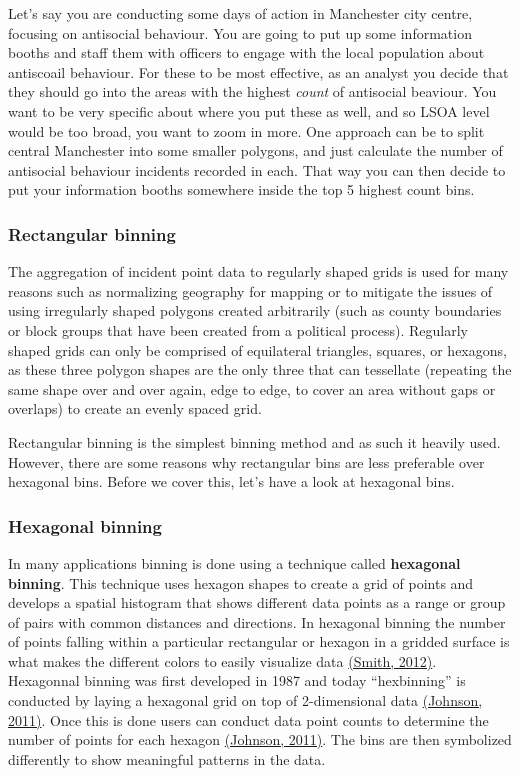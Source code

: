 \documentclass[]{book}
\begin{document}
Let's say you are conducting some days of action in Manchester city centre, focusing on antisocial behaviour. You are going to put up some information booths and staff them with officers to engage with the local population about antiscoail behaviour. For these to be most effective, as an analyst you decide that they should go into the areas with the highest \emph{count} of antisocial beaviour. You want to be very specific about where you put these as well, and so LSOA level would be too broad, you want to zoom in more. One approach can be to split central Manchester into some smaller polygons, and just calculate the number of antisocial behaviour incidents recorded in each. That way you can then decide to put your information booths somewhere inside the top 5 highest count bins.

\hypertarget{rectangular-binning}{%
\subsubsection{Rectangular binning}\label{rectangular-binning}}

The aggregation of incident point data to regularly shaped grids is used for many reasons such as normalizing geography for mapping or to mitigate the issues of using irregularly shaped polygons created arbitrarily (such as county boundaries or block groups that have been created from a political process). Regularly shaped grids can only be comprised of equilateral triangles, squares, or hexagons, as these three polygon shapes are the only three that can tessellate (repeating the same shape over and over again, edge to edge, to cover an area without gaps or overlaps) to create an evenly spaced grid.

Rectangular binning is the simplest binning method and as such it heavily used. However, there are some reasons why rectangular bins are less preferable over hexagonal bins. Before we cover this, let's have a look at hexagonal bins.

\hypertarget{hexagonal-binning}{%
\subsubsection{Hexagonal binning}\label{hexagonal-binning}}

In many applications binning is done using a technique called \textbf{hexagonal binning}. This technique uses hexagon shapes to create a grid of points and develops a spatial histogram that shows different data points as a range or group of pairs with common distances and directions. In hexagonal binning the number of points falling within a particular rectangular or hexagon in a gridded surface is what makes the different colors to easily visualize data \href{https://www.mapbox.com/blog/binning-alternative-point-maps/}{(Smith, 2012)}. Hexagonnal binning was first developed in 1987 and today ``hexbinning'' is conducted by laying a hexagonal grid on top of 2-dimensional data \href{http://indiemaps.com/blog/2011/10/hexbins/}{(Johnson, 2011)}. Once this is done users can conduct data point counts to determine the number of points for each hexagon \href{http://indiemaps.com/blog/2011/10/hexbins/}{(Johnson, 2011)}. The bins are then symbolized differently to show meaningful patterns in the data.
\end{document}
